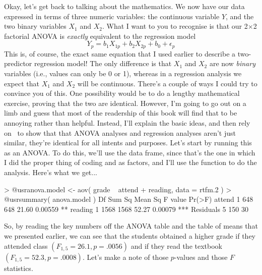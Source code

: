 
Okay, let's get back to talking about the mathematics. We now have our data expressed in terms of three numeric variables: the continuous variable $Y$, and the two binary variables $X_1$ and $X_2$. What I want to you to recognise is that our 2$\times$2 factorial ANOVA is {\it exactly} equivalent to the regression model 
$$
Y_{p} = b_1 X_{1p} + b_2 X_{2p} + b_0 + \epsilon_p
$$
This is, of course, the exact same equation that I used earlier to describe a two-predictor regression model! The only difference is that $X_1$ and $X_2$ are now {\it binary} variables (i.e., values can only be 0 or 1), whereas in a regression analysis we expect that $X_1$ and $X_2$ will be continuous.  There's a couple of ways I could try to convince you of this. One possibility would be to do a lengthy mathematical exercise, proving that the two are identical. However, I'm going to go out on a limb and guess that most of the readership of this book will find that to be annoying rather than helpful. Instead, I'll explain the basic ideas, and then rely on \R\ to show that that ANOVA analyses and regression analyses aren't just similar, they're identical for all intents and purposes. Let's start by running this as an ANOVA. To do this, we'll use the  data frame, since that's the one in which I did the proper thing of coding  and  as factors, and I'll use the  function to do the analysis. Here's what we get...
\begin{rblock1}
> @usr{anova.model <- aov( grade ~ attend + reading, data = rtfm.2 )}
> @usr{summary( anova.model )}
            Df Sum Sq Mean Sq F value  Pr(>F)    
attend       1    648     648   21.60 0.00559 ** 
reading      1   1568    1568   52.27 0.00079 ***
Residuals    5    150      30         
\end{rblock1}
So, by reading the key numbers off the ANOVA table and the table of means that we presented earlier, we can see that the students obtained a higher grade if they attended class $(F_{1,5} = 26.1, p = .0056)$ and if they read the textbook $(F_{1,5} = 52.3, p = .0008)$. Let's make a note of those $p$-values and those $F$ statistics. 

